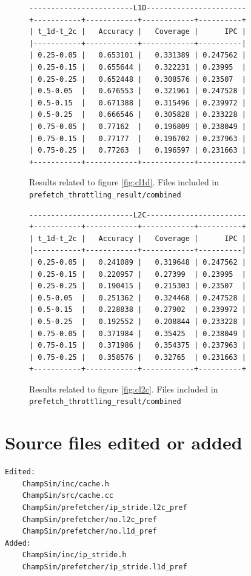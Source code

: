 \documentclass[11pt, swedish, openany]{book}
\begin{document}
\begin{figure}[H]
    \centering
    \begin{BVerbatim}
------------------------L1D-----------------------
+-----------+------------+------------+----------+
| t_1d-t_2c |   Accuracy |   Coverage |      IPC |
|-----------+------------+------------+----------|
| 0.25-0.05 |   0.653101 |   0.331389 | 0.247562 |
| 0.25-0.15 |   0.655644 |   0.322231 | 0.23995  |
| 0.25-0.25 |   0.652448 |   0.308576 | 0.23507  |
| 0.5-0.05  |   0.676553 |   0.321961 | 0.247528 |
| 0.5-0.15  |   0.671388 |   0.315496 | 0.239972 |
| 0.5-0.25  |   0.666546 |   0.305828 | 0.233228 |
| 0.75-0.05 |   0.77162  |   0.196809 | 0.238049 |
| 0.75-0.15 |   0.77177  |   0.196702 | 0.237963 |
| 0.75-0.25 |   0.77263  |   0.196597 | 0.231663 |
+-----------+------------+------------+----------+
    \end{BVerbatim}
    \caption{Results related to figure \ref{fig:cl1d}. Files included in \texttt{prefetch\_throttling\_result/combined}}
\end{figure}

\begin{figure}[H]
    \centering
    \begin{BVerbatim}
------------------------L2C-----------------------
+-----------+------------+------------+----------+
| t_1d-t_2c |   Accuracy |   Coverage |      IPC |
|-----------+------------+------------+----------|
| 0.25-0.05 |   0.241089 |   0.319648 | 0.247562 |
| 0.25-0.15 |   0.220957 |   0.27399  | 0.23995  |
| 0.25-0.25 |   0.190415 |   0.215303 | 0.23507  |
| 0.5-0.05  |   0.251362 |   0.324468 | 0.247528 |
| 0.5-0.15  |   0.228838 |   0.27902  | 0.239972 |
| 0.5-0.25  |   0.192552 |   0.208844 | 0.233228 |
| 0.75-0.05 |   0.371984 |   0.35425  | 0.238049 |
| 0.75-0.15 |   0.371986 |   0.354375 | 0.237963 |
| 0.75-0.25 |   0.358576 |   0.32765  | 0.231663 |
+-----------+------------+------------+----------+
    \end{BVerbatim}
    \caption{Results related to figure \ref{fig:cl2c}. Files included in \texttt{prefetch\_throttling\_result/combined}}
\end{figure}

\section{Source files edited or added}
\vspace{-0.8em}
\begin{verbatim}
Edited:
    ChampSim/inc/cache.h
    ChampSim/src/cache.cc
    ChampSim/prefetcher/ip_stride.l2c_pref
    ChampSim/prefetcher/no.l2c_pref
    ChampSim/prefetcher/no.l1d_pref
Added:
    ChampSim/inc/ip_stride.h
    ChampSim/prefetcher/ip_stride.l1d_pref
\end{verbatim}
\end{document}
